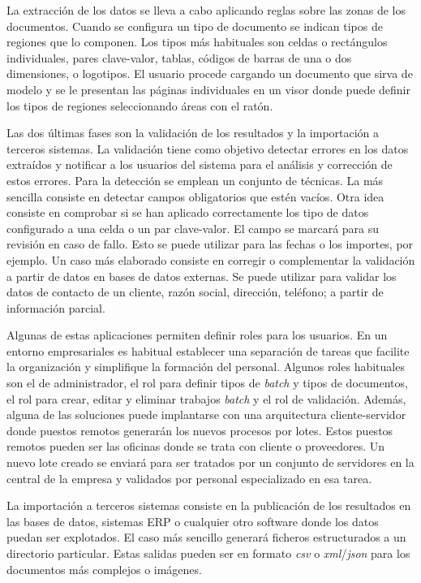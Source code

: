 La extracción de los datos se lleva a cabo aplicando reglas sobre las zonas de los documentos. Cuando se configura un tipo de documento se indican tipos de regiones que lo componen. Los tipos más habituales son celdas o rectángulos individuales, pares clave-valor, tablas, códigos de barras de una o dos dimensiones, o logotipos. El usuario procede cargando un documento que sirva de modelo y se le presentan las páginas individuales en un visor donde puede definir los tipos de regiones seleccionando áreas con el ratón.

Las dos últimas fases son la validación de los resultados y la importación a terceros sistemas. La validación tiene como objetivo detectar errores en los datos extraídos y notificar a los usuarios del sistema para el análisis y corrección de estos errores. Para la detección se emplean un conjunto de técnicas. La más sencilla consiste en detectar campos obligatorios que estén vacíos. Otra idea consiste en comprobar si se han aplicado correctamente los tipo de datos configurado a una celda o un par clave-valor. El campo se marcará para su revisión en caso de fallo. Esto se puede utilizar para las fechas o los importes, por ejemplo. Un caso más elaborado consiste en corregir o complementar la validación a partir de datos en bases de datos externas. Se puede utilizar para validar los datos de contacto de un cliente, razón social, dirección, teléfono; a partir de información parcial.

Algunas de estas aplicaciones permiten definir roles para los usuarios. En un entorno empresariales es habitual establecer una separación de tareas que facilite la organización y simplifique la formación del personal. Algunos roles habituales son el de administrador, el rol para definir tipos de \emph{batch} y tipos de documentos, el rol para crear, editar y eliminar trabajos \emph{batch} y el rol de validación. Además, alguna de las soluciones puede implantarse con una arquitectura cliente-servidor donde puestos remotos generarán los nuevos procesos por lotes. Estos puestos remotos pueden ser las oficinas donde se trata con cliente o proveedores. Un nuevo lote creado se enviará para ser tratados por un conjunto de servidores en la central de la empresa y validados por personal especializado en esa tarea.

La importación a terceros sistemas consiste en la publicación de los resultados en las bases de datos, sistemas ERP o cualquier otro software donde los datos puedan ser explotados. El caso más sencillo generará ficheros estructurados a un directorio particular. Estas salidas pueden ser en formato \emph{\acrlong{csv}} o \emph{\acrlong{xml}}/\emph{\acrlong{json}} para los documentos más complejos o imágenes.

